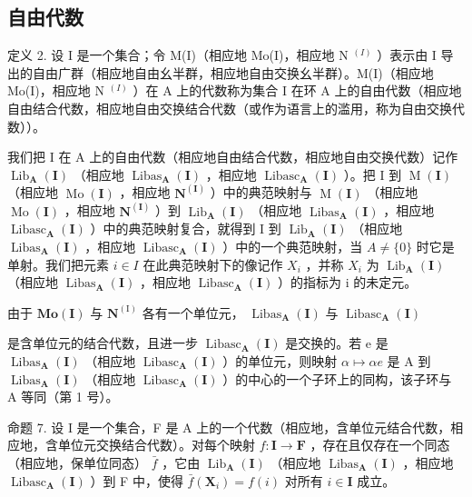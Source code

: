 \subsection{自由代数}

定义 2. 设 I 是一个集合；令 M(I)（相应地 Mo(I)，相应地 N \(^{(I)}\) ）表示由 I 导出的自由广群（相应地自由幺半群，相应地自由交换幺半群）。M(I)（相应地 Mo(I)，相应地 N \(^{(I)}\) ）在 A 上的代数称为集合 I 在环 A 上的自由代数（相应地自由结合代数，相应地自由交换结合代数（或作为语言上的滥用，称为自由交换代数））。

我们把 I 在 A 上的自由代数（相应地自由结合代数，相应地自由交换代数）记作 \(\operatorname{Lib}_{\mathbf{A}}(\mathbf{I})\) （相应地 \(\operatorname{Libas}_{\mathbf{A}}(\mathbf{I})\) ，相应地 \(\operatorname{Libasc}_{\mathbf{A}}(\mathbf{I})\) ）。把 I 到 \(\operatorname{M}(\mathbf{I})\) （相应地 \(\operatorname{Mo}(\mathbf{I})\) ，相应地 \(\mathbf{N}^{(\mathbf{I})}\) ）中的典范映射与 \(\operatorname{M}(\mathbf{I})\) （相应地 \(\operatorname{Mo}(\mathbf{I})\) ，相应地 \(\mathbf{N}^{(\mathbf{I})}\) ）到 \(\operatorname{Lib}_{\mathbf{A}}(\mathbf{I})\) （相应地 \(\operatorname{Libas}_{\mathbf{A}}(\mathbf{I})\) ，相应地 \(\operatorname{Libasc}_{\mathbf{A}}(\mathbf{I})\) ）中的典范映射复合，就得到 I 到 \(\operatorname{Lib}_{\mathbf{A}}(\mathbf{I})\) （相应地 \(\operatorname{Libas}_{\mathbf{A}}(\mathbf{I})\) ，相应地 \(\operatorname{Libasc}_{\mathbf{A}}(\mathbf{I})\) ）中的一个典范映射，当 \(A \neq \{0\}\) 时它是单射。我们把元素 \(i \in I\) 在此典范映射下的像记作 \(X_{i}\) ，并称 \(X_{i}\) 为 \(\operatorname{Lib}_{\mathbf{A}}(\mathbf{I})\) （相应地 \(\operatorname{Libas}_{\mathbf{A}}(\mathbf{I})\) ，相应地 \(\operatorname{Libasc}_{\mathbf{A}}(\mathbf{I})\) ）的指标为 i 的未定元。

由于 \(\mathbf{Mo}(\mathbf{I})\) 与 \(\mathbf{N}^{(\mathrm{I})}\) 各有一个单位元， \(\operatorname{Libas}_{\mathbf{A}}(\mathbf{I})\) 与 \(\operatorname{Libasc}_{\mathbf{A}}(\mathbf{I})\)

是含单位元的结合代数，且进一步 \(\operatorname{Libasc}_{\mathbf{A}}(\mathbf{I})\) 是交换的。若 e 是 \(\operatorname{Libas}_{\mathbf{A}}(\mathbf{I})\) （相应地 \(\operatorname{Libasc}_{\mathbf{A}}(\mathbf{I})\) ）的单位元，则映射 \(\alpha \mapsto \alpha e\) 是 A 到 \(\operatorname{Libas}_{\mathbf{A}}(\mathbf{I})\) （相应地 \(\operatorname{Libasc}_{\mathbf{A}}(\mathbf{I})\) ）的中心的一个子环上的同构，该子环与 A 等同（第 1 号）。

命题 7. 设 I 是一个集合，F 是 A 上的一个代数（相应地，含单位元结合代数，相应地，含单位元交换结合代数）。对每个映射 \(f:\mathbf{I}\to\mathbf{F}\) ，存在且仅存在一个同态（相应地，保单位同态） \(\bar{f}\) ，它由 \(\operatorname{Lib}_{\mathbf{A}}(\mathbf{I})\) （相应地 \(\operatorname{Libas}_{\mathbf{A}}(\mathbf{I})\) ，相应地 \(\operatorname{Libasc}_{\mathbf{A}}(\mathbf{I})\) ）到 F 中，使得 \(\bar{f}(\mathbf{X}_{i})=f(i)\) 对所有 \(i\in\mathbf{I}\) 成立。

